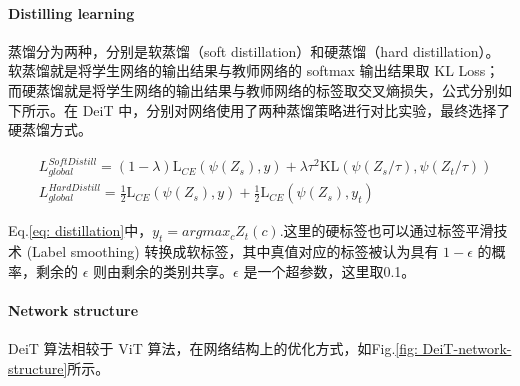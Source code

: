 \documentclass[letterpaper,10pt]{article}
\begin{document}
	\paragraph{Distilling learning}
	
	蒸馏分为两种，分别是软蒸馏（soft distillation）和硬蒸馏（hard distillation）。软蒸馏就是将学生网络的输出结果与教师网络的 softmax 输出结果取 KL Loss；而硬蒸馏就是将学生网络的输出结果与教师网络的标签取交叉熵损失，公式分别如下所示。在 DeiT 中，分别对网络使用了两种蒸馏策略进行对比实验，最终选择了硬蒸馏方式。
	
	\begin{equation}
		\begin{aligned}
			& L_{global}^{SoftDistill} = \left(1-\lambda\right) \text{L}_{CE}\left(\psi(Z_s), y\right) + \lambda \tau^2 \text{KL}\left(\psi(Z_s/\tau), \psi(Z_t/\tau)\right) \\
			& L_{global}^{HardDistill} = \frac{1}{2} \text{L}_{CE}\left(\psi(Z_s), y\right) + \frac{1}{2} \text{L}_{CE}\left(\psi(Z_s),y_t\right)
		\end{aligned}
		\label{eq: distillation}
	\end{equation}
	
	Eq.\ref{eq: distillation}中，$y_t = argmax_{c} Z_t(c)$.这里的硬标签也可以通过标签平滑技术 (Label smoothing) 转换成软标签，其中真值对应的标签被认为具有 $1-\epsilon$ 的概率，剩余的 $\epsilon$ 则由剩余的类别共享。$\epsilon$ 是一个超参数，这里取0.1。
	
	\paragraph{Network structure}
	
	DeiT 算法相较于 ViT 算法，在网络结构上的优化方式，如Fig.\ref{fig: DeiT-network-structure}所示。
	
\end{document}
